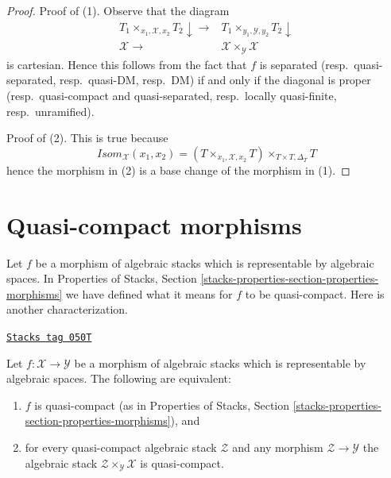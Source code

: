 \begin{proof}
Proof of (1). Observe that the diagram
$$
\begin{array}{cc}T_1 \times_{x_1, \mathcal{X}, x_2} T_2 \downarrow\longrightarrow & T_1 \times_{y_1, \mathcal{Y}, y_2} T_2 \downarrow \\ \mathcal{X} \longrightarrow & \mathcal{X} \times_\mathcal{Y} \mathcal{X}\end{array}
$$
is cartesian. Hence this follows from the fact that $f$ is separated
(resp.\ quasi-separated, resp.\ quasi-DM, resp.\ DM)
if and only if the diagonal is proper
(resp.\ quasi-compact and quasi-separated,
resp.\ locally quasi-finite, resp.\ unramified).

\medskip\noindent
Proof of (2). This is true because
$$
\mathit{Isom}_\mathcal{X}(x_1, x_2) =
(T \times_{x_1, \mathcal{X}, x_2} T) \times_{T \times T, \Delta_T} T
$$
hence the morphism in (2) is a base change of the morphism in (1).
\end{proof}

\section{Quasi-compact morphisms}
\label{stacks-morphisms-section-quasi-compact}
Let $f$ be a morphism of algebraic stacks which is representable by
algebraic spaces. In
Properties of Stacks, Section
\ref{stacks-properties-section-properties-morphisms}
we have defined what it means for $f$ to be quasi-compact.
Here is another characterization.

\begin{lemma}
\label{stacks-morphisms-lemma-characterize-representable-quasi-compact}
\href{https://stacks.math.columbia.edu/tag/050T}{\texttt{Stacks tag 050T}}

Let $f : \mathcal{X} \to \mathcal{Y}$ be a morphism of algebraic stacks
which is representable by algebraic spaces. The following are equivalent:
\begin{enumerate}
\item $f$ is quasi-compact (as in Properties of Stacks,
Section \ref{stacks-properties-section-properties-morphisms}), and
\item for every quasi-compact algebraic stack $\mathcal{Z}$
and any morphism $\mathcal{Z} \to \mathcal{Y}$ the algebraic stack
$\mathcal{Z} \times_\mathcal{Y} \mathcal{X}$ is quasi-compact.
\end{enumerate}
\end{lemma}


